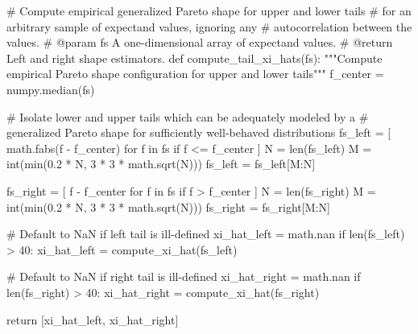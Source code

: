 \documentclass[
  letterpaper,
  DIV=11,
  numbers=noendperiod]{scrartcl}
\newenvironment{Shaded}{\begin{snugshade}}{\end{snugshade}}
\newcommand{\BuiltInTok}[1]{\textcolor[rgb]{0.00,0.23,0.31}{#1}}
\newcommand{\CommentTok}[1]{\textcolor[rgb]{0.37,0.37,0.37}{#1}}
\newcommand{\ControlFlowTok}[1]{\textcolor[rgb]{0.00,0.23,0.31}{#1}}
\newcommand{\DecValTok}[1]{\textcolor[rgb]{0.68,0.00,0.00}{#1}}
\newcommand{\FloatTok}[1]{\textcolor[rgb]{0.68,0.00,0.00}{#1}}
\newcommand{\KeywordTok}[1]{\textcolor[rgb]{0.00,0.23,0.31}{#1}}
\newcommand{\NormalTok}[1]{\textcolor[rgb]{0.00,0.23,0.31}{#1}}
\newcommand{\OperatorTok}[1]{\textcolor[rgb]{0.37,0.37,0.37}{#1}}
\begin{document}
\begin{Shaded}
\begin{Highlighting}[]
\CommentTok{\# Compute empirical generalized Pareto shape for upper and lower tails}
\CommentTok{\# for an arbitrary sample of expectand values, ignoring any}
\CommentTok{\# autocorrelation between the values.}
\CommentTok{\# @param fs A one{-}dimensional array of expectand values.}
\CommentTok{\# @return Left and right shape estimators.}
\KeywordTok{def}\NormalTok{ compute\_tail\_xi\_hats(fs):}
  \CommentTok{"""Compute empirical Pareto shape configuration for upper and lower tails"""}
\NormalTok{  f\_center }\OperatorTok{=}\NormalTok{ numpy.median(fs)}
  
  \CommentTok{\# Isolate lower and upper tails which can be adequately modeled by a }
  \CommentTok{\# generalized Pareto shape for sufficiently well{-}behaved distributions}
\NormalTok{  fs\_left }\OperatorTok{=}\NormalTok{ [ math.fabs(f }\OperatorTok{{-}}\NormalTok{ f\_center) }\ControlFlowTok{for}\NormalTok{ f }\KeywordTok{in}\NormalTok{ fs }\ControlFlowTok{if}\NormalTok{ f }\OperatorTok{\textless{}=}\NormalTok{ f\_center ]}
\NormalTok{  N }\OperatorTok{=} \BuiltInTok{len}\NormalTok{(fs\_left)}
\NormalTok{  M }\OperatorTok{=} \BuiltInTok{int}\NormalTok{(}\BuiltInTok{min}\NormalTok{(}\FloatTok{0.2} \OperatorTok{*}\NormalTok{ N, }\DecValTok{3} \OperatorTok{*} \DecValTok{3} \OperatorTok{*}\NormalTok{ math.sqrt(N)))}
\NormalTok{  fs\_left }\OperatorTok{=}\NormalTok{ fs\_left[M:N]}
  
\NormalTok{  fs\_right }\OperatorTok{=}\NormalTok{ [ f }\OperatorTok{{-}}\NormalTok{ f\_center }\ControlFlowTok{for}\NormalTok{ f }\KeywordTok{in}\NormalTok{ fs }\ControlFlowTok{if}\NormalTok{ f }\OperatorTok{\textgreater{}}\NormalTok{ f\_center ]}
\NormalTok{  N }\OperatorTok{=} \BuiltInTok{len}\NormalTok{(fs\_right)}
\NormalTok{  M }\OperatorTok{=} \BuiltInTok{int}\NormalTok{(}\BuiltInTok{min}\NormalTok{(}\FloatTok{0.2} \OperatorTok{*}\NormalTok{ N, }\DecValTok{3} \OperatorTok{*} \DecValTok{3} \OperatorTok{*}\NormalTok{ math.sqrt(N)))}
\NormalTok{  fs\_right }\OperatorTok{=}\NormalTok{ fs\_right[M:N] }
  
  \CommentTok{\# Default to NaN if left tail is ill{-}defined}
\NormalTok{  xi\_hat\_left }\OperatorTok{=}\NormalTok{ math.nan}
  \ControlFlowTok{if} \BuiltInTok{len}\NormalTok{(fs\_left) }\OperatorTok{\textgreater{}} \DecValTok{40}\NormalTok{:}
\NormalTok{    xi\_hat\_left }\OperatorTok{=}\NormalTok{ compute\_xi\_hat(fs\_left)}
  
  \CommentTok{\# Default to NaN if right tail is ill{-}defined}
\NormalTok{  xi\_hat\_right }\OperatorTok{=}\NormalTok{ math.nan}
  \ControlFlowTok{if} \BuiltInTok{len}\NormalTok{(fs\_right) }\OperatorTok{\textgreater{}} \DecValTok{40}\NormalTok{:}
\NormalTok{    xi\_hat\_right }\OperatorTok{=}\NormalTok{ compute\_xi\_hat(fs\_right)}
    
  \ControlFlowTok{return}\NormalTok{ [xi\_hat\_left, xi\_hat\_right]}
\end{Highlighting}
\end{Shaded}
\end{document}
